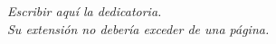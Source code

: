 \thispagestyle{empty}
\null\vfill
\begin{flushright}
  {\large{\textit{Escribir aquí la dedicatoria.\\
  Su extensión no debería exceder de una página.}}}
\end{flushright} %
